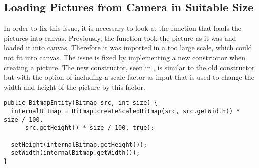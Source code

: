 \subsection{Loading Pictures from Camera in Suitable Size}
In order to fix this issue, it is necessary to look at the function that loads the pictures into canvas.
Previously, the function took the picture as it was and loaded it into canvas.
Therefore it was imported in a too large scale, which could not fit into canvas.
The issue is fixed by implementing a new constructor when creating a picture.
The new constructor, seen in , is similar to the old constructor but with the option of including a scale factor as input that is used to change the width and height of the picture by this factor.

\begin{lstlisting}[caption={New Constructor for \textit{BitmapEntity}}, label=lst:BitmapEnity-Constructor-New, float=h]
public BitmapEntity(Bitmap src, int size) {
  internalBitmap = Bitmap.createScaledBitmap(src, src.getWidth() * size / 100,
      src.getHeight() * size / 100, true);
  
  setHeight(internalBitmap.getHeight());
  setWidth(internalBitmap.getWidth());
}
\end{lstlisting}
